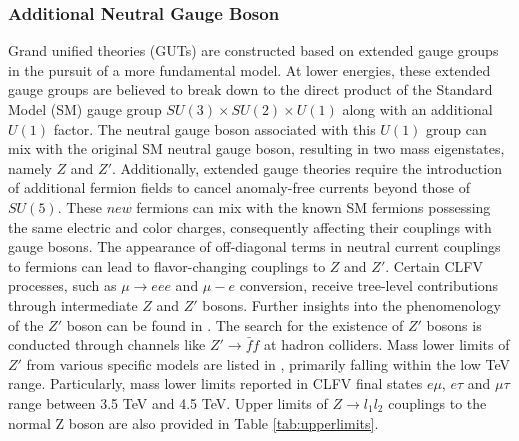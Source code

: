 \subsubsection{Additional Neutral Gauge Boson}
Grand unified theories (GUTs) are constructed based on extended gauge groups in the pursuit of a more fundamental model. At lower energies, these extended gauge groups are believed to break down to the direct product of the Standard Model (SM) gauge group $SU(3) \times SU(2) \times U(1)$ along with an additional $U(1)$ factor. The neutral gauge boson associated with this $U(1)$ group can mix with the original SM neutral gauge boson, resulting in two mass eigenstates, namely $Z$ and $Z'$. Additionally, extended gauge theories require the introduction of additional fermion fields to cancel anomaly-free currents beyond those of $SU(5)$. These $new$ fermions can mix with the known SM fermions possessing the same electric and color charges, consequently affecting their couplings with gauge bosons. The appearance of off-diagonal terms in neutral current couplings to fermions can lead to flavor-changing couplings to $Z$ and $Z'$. Certain CLFV processes, such as $\mu \rightarrow eee$ and $\mu-e$ conversion, receive tree-level contributions through intermediate $Z$ and $Z'$ bosons. Further insights into the phenomenology of the $Z'$ boson can be found in \cite{Leike_1999}. The search for the existence of $Z'$ bosons is conducted through channels like $Z' \rightarrow \bar{f}f$ at hadron colliders. Mass lower limits of $Z'$ from various specific models are listed in \cite{zyla}, primarily falling within the low TeV range. Particularly, mass lower limits reported in CLFV final states $e\mu$, $e\tau$ and $\mu\tau$ range between 3.5 TeV and 4.5 TeV. Upper limits of $Z \rightarrow l_1 l_2$ couplings to the normal Z boson are also provided in Table \ref{tab:upperlimits}.

% 
